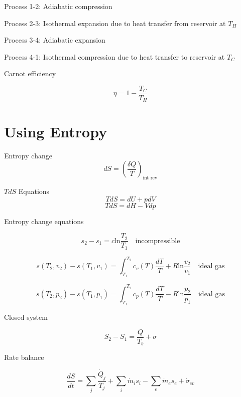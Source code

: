 \documentclass[paper=letter, fontsize=11pt]{scrartcl}
\numberwithin{equation}{section}        %
\numberwithin{figure}{section}          %
\numberwithin{table}{section}               %
\begin{document}
Process 1-2: Adiabatic compression

Process 2-3: Isothermal expansion due to heat transfer from reservoir at $T_H$

Process 3-4: Adiabatic expansion

Process 4-1: Isothermal compression due to heat transfer to reservoir at $T_C$

Carnot efficiency

\begin{equation}
    \eta = 1 - \frac{T_C}{T_H}
\end{equation}

\newpage
\section{Using Entropy}

Entropy change
\begin{equation}
    d S = \left(\frac{\delta Q}{T}\right)_\text{int rev}
\end{equation}

$TdS$ Equations
\begin{equation}
    T dS = dU + p dV
\end{equation}
\begin{equation}
    T dS = dH - V dp
\end{equation}

Entropy change equations

\begin{equation}
    s_2-s_1 = c \text{ln}\frac{T_2}{T_1}\quad\text{incompressible}
\end{equation}

\begin{equation}
    s(T_2,v_2)-s(T_1,v_1) = \int_{T_1}^{T_2}c_v(T)\frac{dT}{T} + R \text{ln}\frac{v_2}{v_1}  \quad\text{ideal gas}
\end{equation}

\begin{equation}
    s(T_2,p_2)-s(T_1,p_1) = \int_{T_1}^{T_2}c_p(T)\frac{dT}{T} - R \text{ln}\frac{p_2}{p_1}  \quad\text{ideal gas}
\end{equation}

Closed system

\begin{equation}
    S_2-S_1 = \frac{Q}{T_b}+\sigma
\end{equation}

Rate balance

\begin{equation}
    \frac{dS}{dt} = \sum_j \frac{\dot Q_j}{T_j} + \sum_i \dot m_i s_i - \sum_e \dot m_e s_e +\dot\sigma_{cv}
\end{equation}
\end{document}
